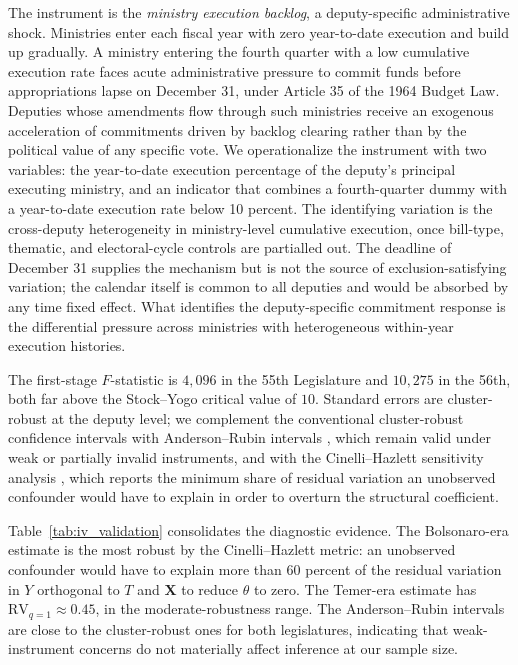 \documentclass[preprint,12pt,authoryear]{elsarticle}
\begin{document}
The instrument is the \emph{ministry execution backlog}, a deputy-specific administrative shock. Ministries enter each fiscal year with zero year-to-date execution and build up gradually. A ministry entering the fourth quarter with a low cumulative execution rate faces acute administrative pressure to commit funds before appropriations lapse on December 31, under Article 35 of the 1964 Budget Law. Deputies whose amendments flow through such ministries receive an exogenous acceleration of commitments driven by backlog clearing rather than by the political value of any specific vote. We operationalize the instrument with two variables: the year-to-date execution percentage of the deputy's principal executing ministry, and an indicator that combines a fourth-quarter dummy with a year-to-date execution rate below 10 percent. The identifying variation is the cross-deputy heterogeneity in ministry-level cumulative execution, once bill-type, thematic, and electoral-cycle controls are partialled out. The deadline of December 31 supplies the mechanism but is not the source of exclusion-satisfying variation; the calendar itself is common to all deputies and would be absorbed by any time fixed effect. What identifies the deputy-specific commitment response is the differential pressure across ministries with heterogeneous within-year execution histories.

The first-stage $F$-statistic is $4{,}096$ in the 55th Legislature and $10{,}275$ in the 56th, both far above the Stock--Yogo critical value of $10$. Standard errors are cluster-robust at the deputy level; we complement the conventional cluster-robust confidence intervals with Anderson--Rubin intervals \citep{AndersonRubin1949}, which remain valid under weak or partially invalid instruments, and with the Cinelli--Hazlett sensitivity analysis \citep{CinelliHazlett2020}, which reports the minimum share of residual variation an unobserved confounder would have to explain in order to overturn the structural coefficient.

Table~\ref{tab:iv_validation} consolidates the diagnostic evidence. The Bolsonaro-era estimate is the most robust by the Cinelli--Hazlett metric: an unobserved confounder would have to explain more than $60$ percent of the residual variation in $Y$ orthogonal to $T$ and $\mathbf{X}$ to reduce $\hat\theta$ to zero. The Temer-era estimate has $\mathrm{RV}_{q=1} \approx 0.45$, in the moderate-robustness range. The Anderson--Rubin intervals are close to the cluster-robust ones for both legislatures, indicating that weak-instrument concerns do not materially affect inference at our sample size.
\end{document}
